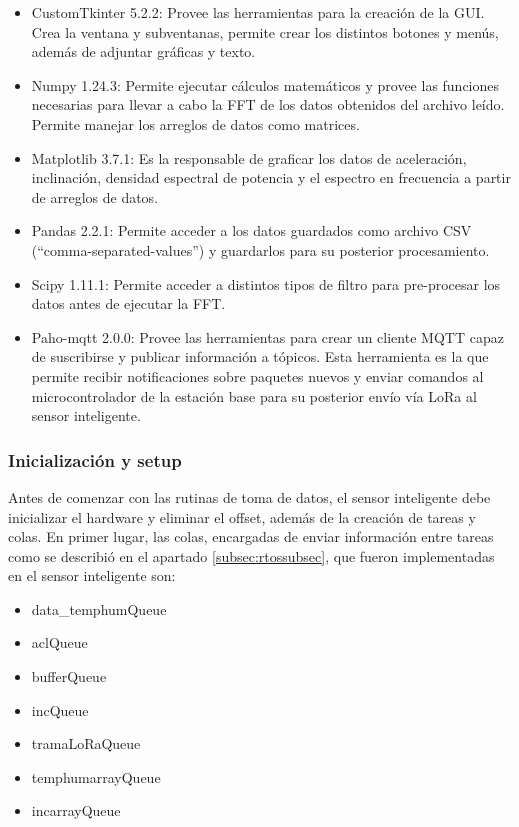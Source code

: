 \begin{itemize}
    \item CustomTkinter 5.2.2: Provee las herramientas para la creación de la GUI. Crea la ventana y subventanas, permite crear los distintos botones y menús, además de adjuntar gráficas y texto.
    \item Numpy 1.24.3: Permite ejecutar cálculos matemáticos y provee las funciones necesarias para llevar a cabo la FFT de los datos obtenidos del archivo leído. Permite manejar los arreglos de datos como matrices.
    \item Matplotlib 3.7.1: Es la responsable de graficar los datos de aceleración, inclinación, densidad espectral de potencia y el espectro en frecuencia a partir de arreglos de datos.
    \item Pandas 2.2.1: Permite acceder a los datos guardados como archivo CSV (``comma-separated-values'') y guardarlos para su posterior procesamiento.
    \item Scipy 1.11.1: Permite acceder a distintos tipos de filtro para pre-procesar los datos antes de ejecutar la FFT.
    \item Paho-mqtt 2.0.0: Provee las herramientas para crear un cliente MQTT capaz de suscribirse y publicar información a tópicos. Esta herramienta es la que permite recibir notificaciones sobre paquetes nuevos y enviar comandos al microcontrolador de la estación base para su posterior envío vía LoRa al sensor inteligente.
\end{itemize}



\subsubsection{Inicialización y setup}

Antes de comenzar con las rutinas de toma de datos, el sensor inteligente debe inicializar el hardware y eliminar el offset, además de la creación de tareas y colas. En primer lugar, las colas, encargadas de enviar información entre tareas como se describió en el apartado \ref{subsec:rtossubsec}, que fueron implementadas en el sensor inteligente son:

\begin{itemize}
    \item data\_temphumQueue
    \item aclQueue
    \item bufferQueue
    \item incQueue
    \item tramaLoRaQueue
    \item temphumarrayQueue
    \item incarrayQueue
\end{itemize}

